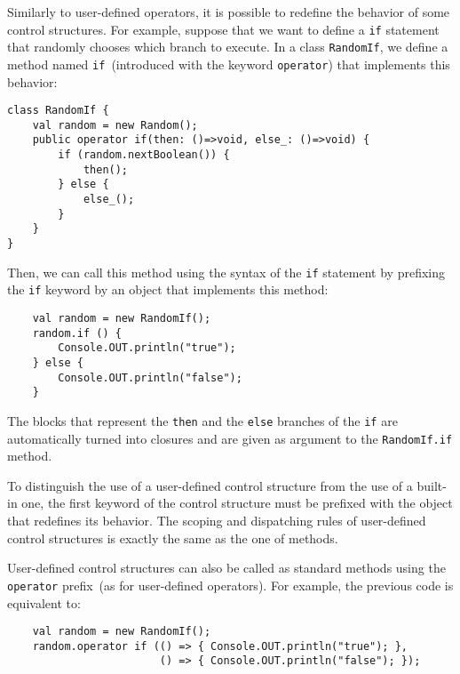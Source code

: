 Similarly to user-defined operators, it is possible to redefine the
behavior of some control structures.
%
For example, suppose that we want to define a \verb+if+ statement that
randomly chooses which branch to execute. In a class \verb+RandomIf+,
we define a method named \verb+if+~(introduced with the keyword
\verb+operator+) that implements this behavior:
\begin{verbatim}
class RandomIf {
    val random = new Random();
    public operator if(then: ()=>void, else_: ()=>void) {
        if (random.nextBoolean()) {
            then();
        } else {
            else_();
        }
    }
}
\end{verbatim}
Then, we can call this method using the syntax of the \verb+if+
statement by prefixing the \verb+if+ keyword by an object that
implements this method:
\begin{verbatim}
    val random = new RandomIf();
    random.if () {
        Console.OUT.println("true");
    } else {
        Console.OUT.println("false");
    }
\end{verbatim}
The blocks that represent the \verb+then+ and the \verb+else+ branches
of the \verb+if+ are automatically turned into closures and are given
as argument to the \verb+RandomIf.if+ method.

To distinguish the use of a user-defined control structure from the
use of a built-in one, the first keyword of the control structure must
be prefixed with the object that redefines its behavior.
%
The scoping and dispatching rules of user-defined control structures
is exactly the same as the one of methods.


User-defined control structures can also be called as standard methods
using the \verb+operator+ prefix~(as for user-defined operators). For
example, the previous code is equivalent to:
\begin{verbatim}
    val random = new RandomIf();
    random.operator if (() => { Console.OUT.println("true"); },
                        () => { Console.OUT.println("false"); });
\end{verbatim}


